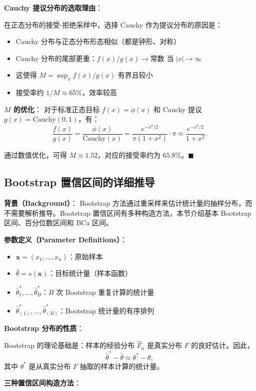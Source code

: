 \textbf{Cauchy 提议分布的选取理由}：

在正态分布的接受-拒绝采样中，选择 Cauchy 作为提议分布的原因是：
\begin{itemize}
\item Cauchy 分布与正态分布形态相似（都是钟形、对称）
\item Cauchy 分布的尾部更重：$f(x)/g(x) \to \text{常数}$ 当 $|x| \to \infty$
\item 这使得 $M = \sup_x f(x)/g(x)$ 有界且较小
\item 接受率约 $1/M \approx 65\%$，效率较高
\end{itemize}

\textbf{$M$ 的优化}：
对于标准正态目标 $f(x) = \phi(x)$ 和 Cauchy 提议 $g(x) = \text{Cauchy}(0, 1)$，有：
\[
\frac{f(x)}{g(x)} = \frac{\phi(x)}{\text{Cauchy}(x)} = \frac{e^{-x^2/2}}{\pi(1+x^2)} \cdot \pi \approx \frac{e^{-x^2/2}}{1+x^2}.
\]

通过数值优化，可得 $M \approx 1.52$，对应的接受率约为 $65.8\%$。$\blacksquare$

\subsection{Bootstrap 置信区间的详细推导}\label{sec:derivation-bootstrap-ci}

\textbf{背景（Background）}：
Bootstrap 方法通过重采样来估计统计量的抽样分布，而不需要解析推导。Bootstrap 置信区间有多种构造方法，本节介绍基本 Bootstrap 区间、百分位数区间和 BCa 区间。

\textbf{参数定义（Parameter Definitions）}：
\begin{itemize}
\item $\mathbf{x} = (x_1, \ldots, x_n)$：原始样本
\item $\widehat{\theta} = s(\mathbf{x})$：目标统计量（样本函数）
\item $\widehat{\theta}^*_1, \ldots, \widehat{\theta}^*_B$：$B$ 次 Bootstrap 重复计算的统计量
\item $\widehat{\theta}^*_{(1)}, \ldots, \widehat{\theta}^*_{(B)}$：Bootstrap 统计量的有序排列
\end{itemize}

\textbf{Bootstrap 分布的性质}：

Bootstrap 的理论基础是：样本的经验分布 $\widehat{F}_n$ 是真实分布 $F$ 的良好估计。因此，
\[
\widehat{\theta}^* - \widehat{\theta} \approx \theta^* - \theta,
\]
其中 $\theta^*$ 是从真实分布 $F$ 抽取的样本计算的统计量。

\textbf{三种置信区间构造方法}：

